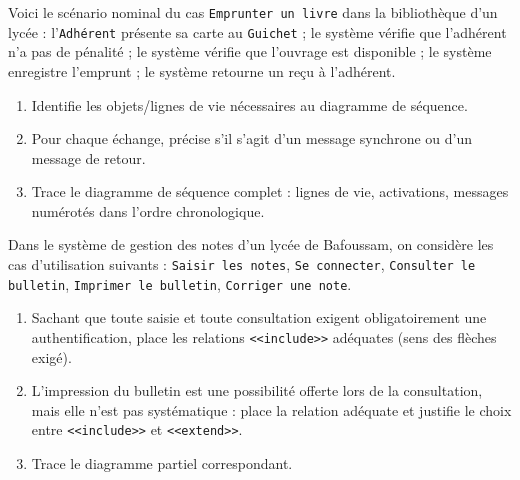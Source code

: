 \documentclass[11pt]{article}
\newcounter{popsec}
\newcounter{popsub}
\newcommand{\courssub}[1]{%
  \stepcounter{popsub}%
  \par\vspace{9pt}\noindent{\popxbold\fontsize{11.5}{13}\selectfont\color{popink}{\color{poporange}\thepopsec.\thepopsub}\hspace{6pt}#1}\par\nopagebreak\vspace{4pt}
}
\begin{document}
\begin{exercice}
Voici le scénario nominal du cas \texttt{Emprunter un livre} dans la bibliothèque d'un lycée : l'\texttt{Adhérent} présente sa carte au \texttt{Guichet} ; le système vérifie que l'adhérent n'a pas de pénalité ; le système vérifie que l'ouvrage est disponible ; le système enregistre l'emprunt ; le système retourne un reçu à l'adhérent.
\begin{enumerate}
\item Identifie les objets/lignes de vie nécessaires au diagramme de séquence.
\item Pour chaque échange, précise s'il s'agit d'un message synchrone ou d'un message de retour.
\item Trace le diagramme de séquence complet : lignes de vie, activations, messages numérotés dans l'ordre chronologique.
\end{enumerate}
\end{exercice}

\begin{exercice}
Dans le système de gestion des notes d'un lycée de Bafoussam, on considère les cas d'utilisation suivants : \texttt{Saisir les notes}, \texttt{Se connecter}, \texttt{Consulter le bulletin}, \texttt{Imprimer le bulletin}, \texttt{Corriger une note}.
\begin{enumerate}
\item Sachant que toute saisie et toute consultation exigent obligatoirement une authentification, place les relations \texttt{<<include>>} adéquates (sens des flèches exigé).
\item L'impression du bulletin est une possibilité offerte lors de la consultation, mais elle n'est pas systématique : place la relation adéquate et justifie le choix entre \texttt{<<include>>} et \texttt{<<extend>>}.
\item Trace le diagramme partiel correspondant.
\end{enumerate}
\end{exercice}

\courssub{Je me prépare au Bac}
\end{document}
